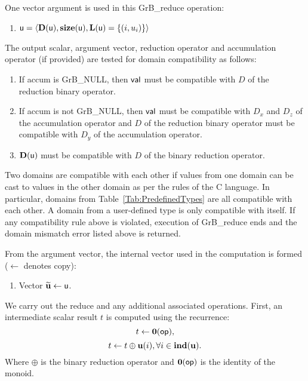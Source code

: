 One vector argument is used in this {\sf GrB\_reduce} operation:
\begin{enumerate}
	\item ${\sf u} = \langle \bold{D}({\sf u}),\bold{size}({\sf u}),
    \bold{L}({\sf u}) = \{(i,u_i) \} \rangle$

\end{enumerate}

The output scalar, argument vector, reduction operator and accumulation 
operator (if provided) are tested for domain compatibility as follows:
\begin{enumerate}

	\item If {\sf accum} is {\sf GrB\_NULL}, then ${\sf val}$ must be 
    compatible with $D$ of the reduction binary operator.

	\item If {\sf accum} is not {\sf GrB\_NULL}, then ${\sf val}$ must be
    compatible with $D_x$ and $D_z$ of the accumulation operator and 
    $D$ of the reduction binary operator must be compatible with $D_y$ of the accumulation operator.

	\item $\bold{D}({\sf u})$ must be compatible with $D$ of the binary reduction operator.
\end{enumerate}
Two domains are compatible with each other if values from one domain can be cast 
to values in the other domain as per the rules of the C language.
In particular, domains from Table~\ref{Tab:PredefinedTypes} are all compatible 
with each other. A domain from a user-defined type is only compatible with itself.
If any compatibility rule above is violated, execution of {\sf GrB\_reduce} ends
and the domain mismatch error listed above is returned.

From the argument vector, the internal vector used in 
the computation is formed ($\leftarrow$ denotes copy):
\begin{enumerate}
	\item Vector ${\bf \widetilde{u}} \leftarrow {\sf u}$.
\end{enumerate}

We carry out the reduce and any additional 
associated operations.  
First, an intermediate scalar result $t$ is computed using the recurrence:
\[
	t \leftarrow \bold{0}({\sf op}),
\]
\[
	t \leftarrow t \oplus {\bf u}(i), \forall i \in \bold{ind}({\bf u}). 
\]
Where $\oplus$ is the binary reduction operator and $\bold{0}({\sf op})$ is the identity of the monoid.

